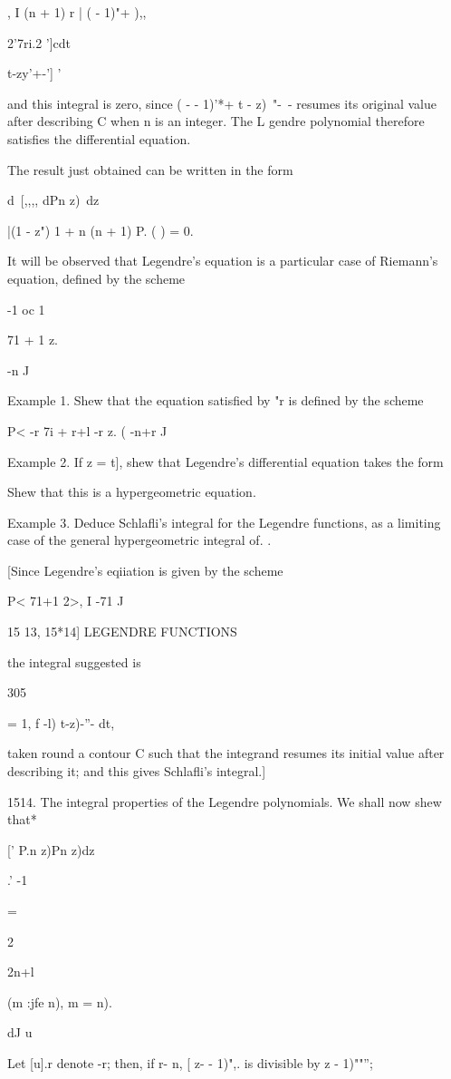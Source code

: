 , I (n + 1) r | ( - 1)"+ ),,

  2'7ri.2 ']cdt\ \ {t-zy'+-'] '

and this integral is zero, since ( - - 1)'*+ t - z)~"-~- resumes its
original value after describing C when n is an integer. The L gendre
polynomial therefore satisfies the differential equation.

The result just obtained can be written in the form

d\ [,,,, dPn z)\ dz

|(1 - z") 1 + n (n + 1) P. ( ) = 0.

It will be observed that Legendre's equation is a particular case of
Riemann's equation, defined by the scheme

-1 oc 1

71 + 1 z.

-n J

Example 1. Shew that the equation satisfied by "r is defined by the
scheme

P< -r 7i + r+l -r z. ( -n+r J

Example 2. If z = t], shew that Legendre's differential equation takes
the form

Shew that this is a hypergeometric equation.

Example 3. Deduce Schlafli's integral for the Legendre functions, as a
limiting case of the general hypergeometric integral of. .

[Since Legendre's eqiiation is given by the scheme

P< 71+1 2>, I -71 J

15 13, 15*14] LEGENDRE FUNCTIONS

the integral suggested is

305

= 1, f -l) t-z)-''- dt,

taken round a contour C such that the integrand resumes its initial
value after describing it; and this gives Schlafli's integral.]

1514. The integral properties of the Legendre polynomials. We shall
now shew that*

[' P.n z)Pn z)dz

.' -1

=

2

2n+l

(m :jfe n), m = n).

dJ u

Let [u].r denote -r; then, if r- n, [ z- - 1)",. is divisible by z -
1)""'';

}
